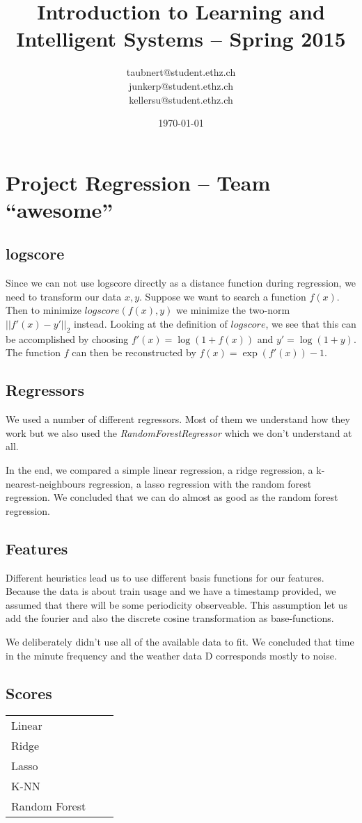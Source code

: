 \documentclass[a4paper, 11pt]{article}
\title{Introduction to Learning and Intelligent Systems -- Spring 2015}
\author{taubnert@student.ethz.ch\\ junkerp@student.ethz.ch\\ kellersu@student.ethz.ch\\}
\date{\today}
\begin{document}
\maketitle

\section{Project Regression -- Team ``awesome''}



\subsection{logscore}
Since we can not use logscore directly as a distance function during regression,
we need to transform our data $x,y$.
Suppose we want to search a function $f(x)$.
Then to minimize $logscore(f(x),y)$ we minimize the two-norm $||f'(x) - y'||_2$ instead.
Looking at the definition of $logscore$, we see that this can be accomplished by choosing $f'(x) = \log(1 + f(x))$ and $y' = \log(1 + y)$.
The function $f$ can then be reconstructed by $f(x) = \exp(f'(x)) - 1$.

\subsection{Regressors}
We used a number of different regressors.
Most of them we understand how they work but we also used the \emph{RandomForestRegressor} which we don't understand at all.

In the end, we compared a simple linear regression, a ridge regression, a k-nearest-neighbours regression, a lasso regression with the random forest regression.
We concluded that we can do almost as good as the random forest regression.

\subsection{Features}
Different heuristics lead us to use different basis functions for our features.
Because the data is about train usage and we have a timestamp provided, we assumed that there will be some periodicity observeable.
This assumption let us add the fourier and also the discrete cosine transformation as base-functions.

We deliberately didn't use all of the available data to fit.
We concluded that time in the minute frequency and the weather data D corresponds mostly to noise.

\subsection{Scores}

\begin{tabular}{lll}
Linear        & & \\
Ridge         & & \\
Lasso         & & \\
K-NN          & & \\
Random Forest & &
\end{tabular}
\end{document}
